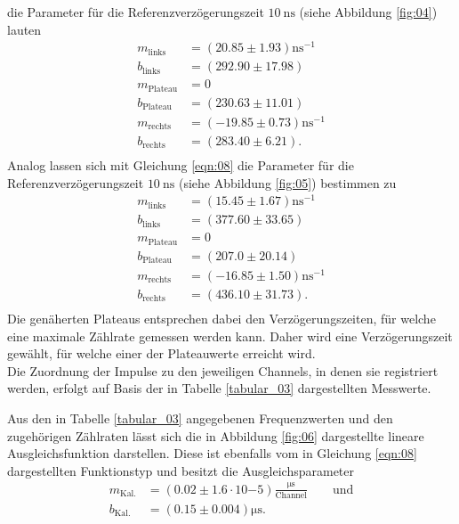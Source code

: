 \noindent die Parameter für die Referenzverzögerungszeit $\SI{10}{\nano\second}$
(siehe Abbildung \ref{fig:04}) lauten
\begin{align*}
  m_\text{links}   &= {(20.85 \pm 1.93)} \si{\nano\second^{-1}} \\
  b_\text{links}   &= {(292.90 \pm 17.98)} \\
  m_\text{Plateau} &= {0} \\
  b_\text{Plateau} &= {(230.63 \pm 11.01)} \\
  m_\text{rechts}  &= {(-19.85 \pm 0.73)} \si{\nano\second^{-1}} \\
  b_\text{rechts}  &= {(283.40 \pm 6.21)}. \\
\end{align*}
\noindent Analog lassen sich mit Gleichung \ref{eqn:08} die Parameter
für die Referenzverzögerungszeit $\SI{10}{\nano\second}$
(siehe Abbildung \ref{fig:05}) bestimmen zu
\begin{align*}
  m_\text{links}   &= {(15.45 \pm 1.67)} \si{\nano\second^{-1}} \\
  b_\text{links}   &= {(377.60 \pm 33.65)} \\
  m_\text{Plateau} &= {0} \\
  b_\text{Plateau} &= {(207.0 \pm 20.14)} \\
  m_\text{rechts}  &= {(-16.85 \pm 1.50)} \si{\nano\second^{-1}} \\
  b_\text{rechts}  &= {(436.10 \pm 31.73)}. \\
\end{align*}
\noindent Die genäherten Plateaus entsprechen dabei den Verzögerungszeiten, für
welche eine maximale Zählrate gemessen werden kann. Daher wird eine
Verzögerungszeit gewählt, für welche einer der Plateauwerte erreicht wird. \\
\newline
\noindent Die Zuordnung der Impulse zu den jeweiligen Channels, in denen sie
registriert werden, erfolgt auf Basis der in Tabelle \ref{tabular_03} dargestellten
Messwerte. \\
\FloatBarrier

\FloatBarrier
\noindent Aus den in Tabelle \ref{tabular_03} angegebenen Frequenzwerten und den
zugehörigen Zählraten lässt sich die in Abbildung \ref{fig:06} dargestellte
lineare Ausgleichsfunktion darstellen. Diese ist ebenfalls vom in Gleichung
\ref{eqn:08} dargestellten Funktionstyp und besitzt die Ausgleichsparameter
\begin{align*}
  m_\text{Kal.} &= (0.02 \pm 1.6 \cdot 10{-5}) \frac{\si{\micro\second}}{\text{Channel}}  \qquad \text{und}\\
  b_\text{Kal.} &= (0.15 \pm 0.004) \si{\micro\second}.
\end{align*}
